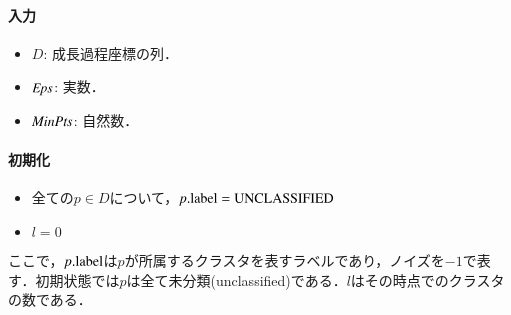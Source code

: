 \paragraph{入力}
\begin{itemize}
\item
$D$: 成長過程座標の列．
\item
${\it Eps}$: 実数．
\item
${\it MinPts}$: 自然数．
\end{itemize}

\paragraph{初期化}
\begin{itemize}
\item
全ての$p \in D$について，$p.{\rm label} = {\rm UNCLASSIFIED}$
\item
$l = 0$
\end{itemize}

ここで，$p.{\rm label}$は$p$が所属するクラスタを表すラベルであり，ノイズを$-1$で表す．初期状態では$p$は全て未分類(unclassified)である．$l$はその時点でのクラスタの数である．

